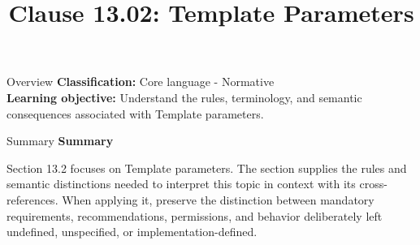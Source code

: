 \documentclass[10pt,letterpaper]{article}
\title{Clause 13.02: Template Parameters}
\author{}
\date{}
\begin{document}
\maketitle
\begin{CornellOverviewBox}{Overview}
\textbf{Classification:} Core language - Normative\\[2pt]
\textbf{Learning objective:} Understand the rules, terminology, and semantic consequences associated with Template parameters.
\end{CornellOverviewBox}\begin{CornellSummaryBox}{Summary}
{\sffamily\bfseries\color{Accent} Summary}\par\vspace{3pt}Section 13.2 focuses on Template parameters. The section supplies the rules and semantic distinctions needed to interpret this topic in context with its cross-references. When applying it, preserve the distinction between mandatory requirements, recommendations, permissions, and behavior deliberately left undefined, unspecified, or implementation-defined.
\end{CornellSummaryBox}
\end{document}
